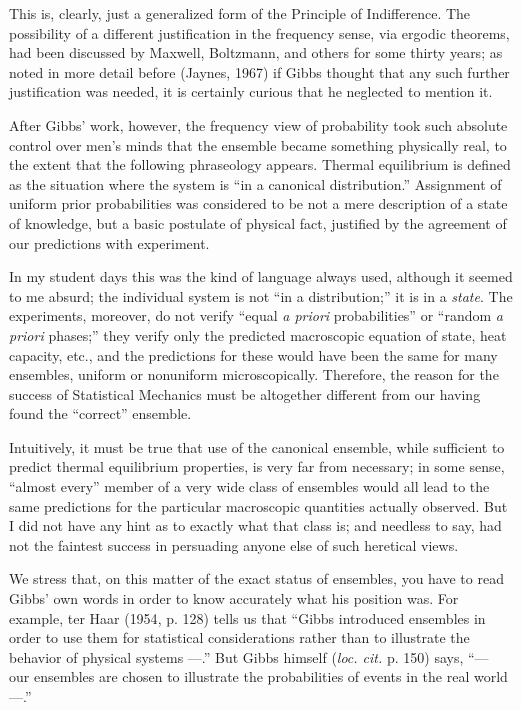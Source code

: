 This is, clearly, just a generalized form of the Principle of Indifference.
The possibility of a different justification in the frequency sense, via ergodic theorems, had been discussed by Maxwell, Boltzmann, and others for some thirty years; as noted in more detail before (Jaynes, \cite{jaynes67}{1967}) if Gibbs thought that any such further justification was needed, it is certainly curious that he neglected to mention it.

After Gibbs’ work, however, the frequency view of probability took such absolute control over men's minds that the ensemble became something physically real, to the extent that the following phraseology appears.
Thermal equilibrium is defined as the situation where the system is ``in a canonical distribution.''
Assignment of uniform prior probabilities was considered to be not a mere description of a state of knowledge, but a basic postulate of physical fact, justified by the agreement of our predictions with experiment.

In my student days this was the kind of language always used, although it seemed to me absurd; the individual system is not ``in a distribution;'' it is in a \emph{state}.
The experiments, moreover, do not verify ``equal \emph{a priori} probabilities'' or ``random \emph{a priori} phases;'' they verify only the predicted macroscopic equation of state, heat capacity, etc., and the predictions for these would have been the same for many ensembles, uniform or nonuniform microscopically.
Therefore, the reason for the success of Statistical Mechanics must be altogether different from our having found the ``correct'' ensemble.

Intuitively, it must be true that use of the canonical ensemble, while sufficient to predict thermal equilibrium properties, is very far from necessary; in some sense, ``almost every'' member of a very wide class of ensembles would all lead to the same predictions for the particular macroscopic quantities actually observed.
But I did not have any hint as to exactly what that class is; and needless to say, had not the faintest success in persuading anyone else of such heretical views.

We stress that, on this matter of the exact status of ensembles, you have to read Gibbs’ own words in order to know accurately what his position was.
For example, ter Haar (\cite{haar}{1954}, p. 128) tells us that ``Gibbs introduced ensembles in order to use them for statistical considerations rather than to illustrate the behavior of physical systems ---.''
But Gibbs himself (\emph{loc. cit.} p. 150) says, ``--- our ensembles are chosen to illustrate the probabilities of events in the real world ---.''

